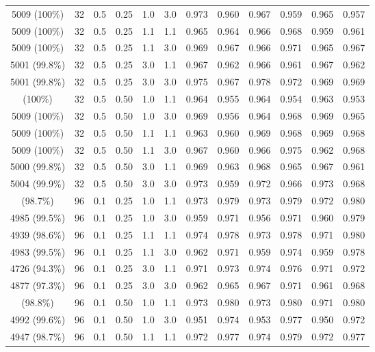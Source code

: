 \begin{longtable}[t]{ccccccrrrrrr}
5009 (100\%) & 32 & 0.5 & 0.25 & 1.0 & 3.0 & 0.973 & 0.960 & 0.967 & 0.959 & 0.965 & 0.957\\
5009 (100\%) & 32 & 0.5 & 0.25 & 1.1 & 1.1 & 0.965 & 0.964 & 0.966 & 0.968 & 0.959 & 0.961\\
5009 (100\%) & 32 & 0.5 & 0.25 & 1.1 & 3.0 & 0.969 & 0.967 & 0.966 & 0.971 & 0.965 & 0.967\\
5001 (99.8\%) & 32 & 0.5 & 0.25 & 3.0 & 1.1 & 0.967 & 0.962 & 0.966 & 0.961 & 0.967 & 0.962\\
5001 (99.8\%) & 32 & 0.5 & 0.25 & 3.0 & 3.0 & 0.975 & 0.967 & 0.978 & 0.972 & 0.969 & 0.969\\
\addlinespace
5008 (100\%) & 32 & 0.5 & 0.50 & 1.0 & 1.1 & 0.964 & 0.955 & 0.964 & 0.954 & 0.963 & 0.953\\
5009 (100\%) & 32 & 0.5 & 0.50 & 1.0 & 3.0 & 0.969 & 0.956 & 0.964 & 0.968 & 0.969 & 0.965\\
5009 (100\%) & 32 & 0.5 & 0.50 & 1.1 & 1.1 & 0.963 & 0.960 & 0.969 & 0.968 & 0.969 & 0.968\\
5009 (100\%) & 32 & 0.5 & 0.50 & 1.1 & 3.0 & 0.967 & 0.960 & 0.966 & 0.975 & 0.962 & 0.968\\
5000 (99.8\%) & 32 & 0.5 & 0.50 & 3.0 & 1.1 & 0.969 & 0.963 & 0.968 & 0.965 & 0.967 & 0.961\\
5004 (99.9\%) & 32 & 0.5 & 0.50 & 3.0 & 3.0 & 0.973 & 0.959 & 0.972 & 0.966 & 0.973 & 0.968\\
\addlinespace
4944 (98.7\%) & 96 & 0.1 & 0.25 & 1.0 & 1.1 & 0.973 & 0.979 & 0.973 & 0.979 & 0.972 & 0.980\\
4985 (99.5\%) & 96 & 0.1 & 0.25 & 1.0 & 3.0 & 0.959 & 0.971 & 0.956 & 0.971 & 0.960 & 0.979\\
4939 (98.6\%) & 96 & 0.1 & 0.25 & 1.1 & 1.1 & 0.974 & 0.978 & 0.973 & 0.978 & 0.971 & 0.980\\
4983 (99.5\%) & 96 & 0.1 & 0.25 & 1.1 & 3.0 & 0.962 & 0.971 & 0.959 & 0.974 & 0.959 & 0.978\\
4726 (94.3\%) & 96 & 0.1 & 0.25 & 3.0 & 1.1 & 0.971 & 0.973 & 0.974 & 0.976 & 0.971 & 0.972\\
4877 (97.3\%) & 96 & 0.1 & 0.25 & 3.0 & 3.0 & 0.962 & 0.965 & 0.967 & 0.971 & 0.961 & 0.968\\
\addlinespace
4950 (98.8\%) & 96 & 0.1 & 0.50 & 1.0 & 1.1 & 0.973 & 0.980 & 0.973 & 0.980 & 0.971 & 0.980\\
4992 (99.6\%) & 96 & 0.1 & 0.50 & 1.0 & 3.0 & 0.951 & 0.974 & 0.953 & 0.977 & 0.950 & 0.972\\
4947 (98.7\%) & 96 & 0.1 & 0.50 & 1.1 & 1.1 & 0.972 & 0.977 & 0.974 & 0.979 & 0.972 & 0.977\\

\end{longtable}

